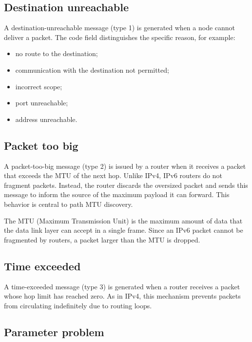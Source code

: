 \begin{center}
\end{center}

\subsection{Destination unreachable}

A destination-unreachable message (type 1) is generated when a node cannot deliver a packet. The code field distinguishes the specific reason, for example:

\begin{itemize}
\item no route to the destination;
\item communication with the destination not permitted;
\item incorrect scope;
\item port unreachable;
\item address unreachable.
\end{itemize}

\subsection{Packet too big}

A packet-too-big message (type 2) is issued by a router when it receives a packet that exceeds the MTU of the next hop. Unlike IPv4, IPv6 routers do not fragment packets. Instead, the router discards the oversized packet and sends this message to inform the source of the maximum payload it can forward. This behavior is central to path MTU discovery.

The MTU (Maximum Transmission Unit) is the maximum amount of data that the data
link layer can accept in a single frame. Since an IPv6 packet cannot be
fragmented by routers, a packet larger than the MTU is dropped.

\subsection{Time exceeded}

A time-exceeded message (type 3) is generated when a router receives a packet whose hop limit has reached zero. As in IPv4, this mechanism prevents packets from circulating indefinitely due to routing loops.

\subsection{Parameter problem}

